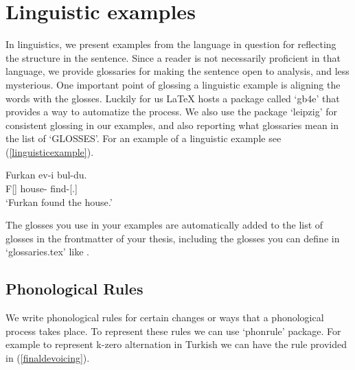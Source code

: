 \section{Linguistic examples}

In linguistics, we present examples from the language in question for reflecting the structure in the sentence. Since a reader is not necessarily proficient in that language, we provide glossaries for making the sentence open to analysis, and less mysterious. One important point of glossing a linguistic example is aligning the words with the glosses. Luckily for us {\LaTeX} hosts a package called `gb4e' that provides a way to automatize the process. We also use the package `leipzig' for consistent glossing in our examples, and also reporting what glossaries mean in the list of `GLOSSES'. For an example of a linguistic example see (\ref{linguisticexample}).

\begin{exe}
    \ex \label{linguisticexample}
    \gll 
    Furkan ev-i bul-du. \\ F[{\Nom}] house-{\Acc} find-{\Pst}[{\Third}.{\Sg}] \\
    \glt `Furkan found the house.'
\end{exe}

The glosses you use in your examples are automatically added to the list of glosses in the frontmatter of your thesis, including the glosses you can define in `glossaries.tex' like {\Aor}.

\subsection{Phonological Rules}

We write phonological rules for certain changes or ways that a phonological process takes place. To represent these rules we can use `phonrule' package. For example to represent k-zero alternation in Turkish we can have the rule provided in (\ref{finaldevoicing}).

\begin{exe}
\ex \label{finaldevoicing} 
\end{exe}